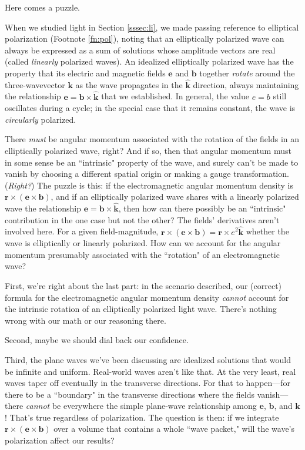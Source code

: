 \documentclass[12pt]{article}
\renewcommand{\vv}[1]{\mathbf{#1}}
\begin{document}
Here comes a puzzle.

When we studied light in Section \ref{sssec:li}, we made passing reference to elliptical polarization (Footnote \ref{fn:pol}), noting that an elliptically polarized wave can always be expressed as a sum of solutions whose amplitude vectors are real (called \emph{linearly} polarized waves). An idealized elliptically polarized wave has the property that its electric and magnetic fields $\vv e$ and $\vv b$ together \emph{rotate} around the three-wavevector $\vv k$ as the wave propagates in the $\vv{\hat k}$ direction, always maintaining the relationship $\vv e = \vv b \times \vv{\hat k}$ that we established. In general, the value $e = b$ still oscillates during a cycle; in the special case that it remains constant, the wave is \emph{circularly} polarized.

There \emph{must} be angular momentum associated with the rotation of the fields in an elliptically polarized wave, right? And if so, then that angular momentum must in some sense be an ``intrinsic" property of the wave, and surely can't be made to vanish by choosing a different spatial origin or making a gauge transformation. (\emph{Right?}) The puzzle is this: if the electromagnetic angular momentum density is $\vv r \times (\vv e \times \vv b)$, and if an elliptically polarized wave shares with a linearly polarized wave the relationship ${\vv e = \vv b \times \vv{\hat k}}$, then how can there possibly be an ``intrinsic" contribution in the one case but not the other? The fields' derivatives aren't involved here. For a given field-magnitude, ${\vv r \times (\vv e \times \vv b) = \vv r \times e^2 \vv{\hat k}}$ whether the wave is elliptically or linearly polarized. How can we account for the angular momentum presumably associated with the ``rotation" of an electromagnetic wave?

First, we're right about the last part: in the scenario described, our (correct) formula for the electromagnetic angular momentum density \emph{cannot} account for the intrinsic rotation of an elliptically polarized light wave. There's nothing wrong with our math or our reasoning there.

Second, maybe we should dial back our confidence.

Third, the plane waves we've been discussing are idealized solutions that would be infinite and uniform. Real-world waves aren't like that. At the very least, real waves taper off eventually in the transverse directions. For that to happen---for there to be a ``boundary" in the transverse directions where the fields vanish---there \emph{cannot} be everywhere the simple plane-wave relationship among $\vv e$, $\vv b$, and $\vv k$! That's true regardless of polarization. The question is then: if we integrate $\vv r \times (\vv e \times \vv b)$ over a volume that contains a whole ``wave packet," will the wave's polarization affect our results?
\end{document}
